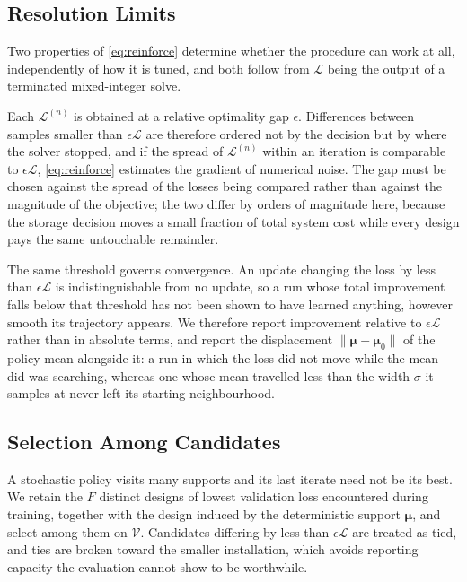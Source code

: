 \documentclass[journal]{IEEEtran}
\begin{document}
\subsection{Resolution Limits}
\label{sec:resolution}

Two properties of \eqref{eq:reinforce} determine whether the procedure can
work at all, independently of how it is tuned, and both follow from
$\mathcal{L}$ being the output of a terminated mixed-integer solve.

Each $\mathcal{L}^{(n)}$ is obtained at a relative optimality gap
$\epsilon$. Differences between samples smaller than $\epsilon\mathcal{L}$
are therefore ordered not by the decision but by where the solver stopped,
and if the spread of $\mathcal{L}^{(n)}$ within an iteration is comparable
to $\epsilon\mathcal{L}$, \eqref{eq:reinforce} estimates the gradient of
numerical noise. The gap must be chosen against the spread of the losses
being compared rather than against the magnitude of the objective; the two
differ by orders of magnitude here, because the storage decision moves a
small fraction of total system cost while every design pays the same
untouchable remainder.

The same threshold governs convergence. An update changing the loss by
less than $\epsilon\mathcal{L}$ is indistinguishable from no update, so a
run whose total improvement falls below that threshold has not been shown
to have learned anything, however smooth its trajectory appears. We
therefore report improvement relative to $\epsilon\mathcal{L}$ rather than
in absolute terms, and report the displacement
$\|\boldsymbol{\mu}-\boldsymbol{\mu}_0\|$ of the policy mean alongside it:
a run in which the loss did not move while the mean did was searching,
whereas one whose mean travelled less than the width $\sigma$ it samples
at never left its starting neighbourhood.

\subsection{Selection Among Candidates}
\label{sec:finalists}

A stochastic policy visits many supports and its last iterate need not be
its best. We retain the $F$ distinct designs of lowest validation loss
encountered during training, together with the design induced by the
deterministic support $\boldsymbol{\mu}$, and select among them on
$\mathcal{V}$. Candidates differing by less than $\epsilon\mathcal{L}$ are
treated as tied, and ties are broken toward the smaller installation,
which avoids reporting capacity the evaluation cannot show to be
worthwhile.
\end{document}
